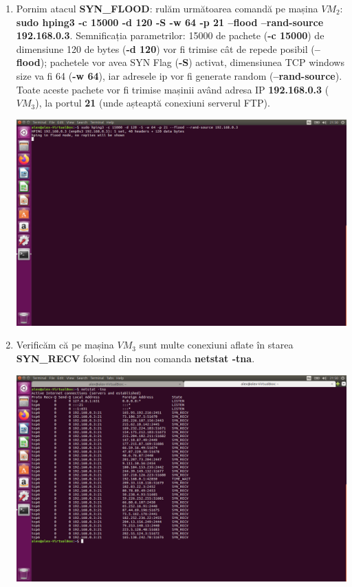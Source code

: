 \documentclass[a4paper]{article}
\begin{document}
\begin{enumerate}
    \item Pornim atacul \textbf{SYN\_FLOOD}: rulăm următoarea comandă pe mașina $ VM_2 $: \textbf{sudo hping3 -c 15000 -d 120 -S -w 64 -p 21 --flood --rand-source 192.168.0.3}. Semnificația parametrilor: 15000 de pachete (\textbf{-c 15000}) de dimensiune 120 de bytes (\textbf{-d 120}) vor fi trimise cât de repede posibil (\textbf{--flood}); pachetele vor avea SYN Flag (\textbf{-S}) activat,  dimensiunea TCP windows size va fi 64 (\textbf{-w 64}), iar adresele ip vor fi generate random (\textbf{--rand-source}). Toate aceste pachete vor fi trimise mașinii având adresa IP \textbf{192.168.0.3} ($ VM_3 $), la portul \textbf{21} (unde așteaptă conexiuni serverul FTP).
    
    \begin{center}
        \hspace*{-1.8cm}                                           \includegraphics[scale=0.56]{"./img/pas3.png"}       
    \end{center}
    
    \item Verificăm că pe mașina $ VM_3 $ sunt multe conexiuni aflate în starea \textbf{SYN\_RECV} folosind din nou comanda \textbf{netstat -tna}.
    
    \begin{center}
        \hspace*{-1.8cm}                                           \includegraphics[scale=0.56]{"./img/pas4.png"}       
    \end{center}
    

\end{enumerate}
\end{document}
